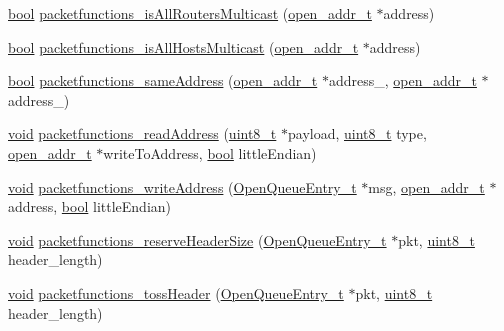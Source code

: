 \begin{DoxyCompactItemize}
\item 
\hyperlink{_p_e___types_8h_a97a80ca1602ebf2303258971a2c938e2}{bool} \hyperlink{group___packet_functions_ga47c60182596145c31db05b11926cdcb2}{packetfunctions\+\_\+is\+All\+Routers\+Multicast} (\hyperlink{structopen__addr__t}{open\+\_\+addr\+\_\+t} $\ast$address)
\item 
\hyperlink{_p_e___types_8h_a97a80ca1602ebf2303258971a2c938e2}{bool} \hyperlink{group___packet_functions_ga4002d21fb26813d4652268eccf7e4acd}{packetfunctions\+\_\+is\+All\+Hosts\+Multicast} (\hyperlink{structopen__addr__t}{open\+\_\+addr\+\_\+t} $\ast$address)
\item 
\hyperlink{_p_e___types_8h_a97a80ca1602ebf2303258971a2c938e2}{bool} \hyperlink{group___packet_functions_ga1f1461cad2a1e59c303d24fa8e165569}{packetfunctions\+\_\+same\+Address} (\hyperlink{structopen__addr__t}{open\+\_\+addr\+\_\+t} $\ast$address\+\_, \hyperlink{structopen__addr__t}{open\+\_\+addr\+\_\+t} $\ast$address\+\_)
\item 
\hyperlink{usb__devapi_8h_afabf60e7f57651d6d595a02c75f07cd0}{void} \hyperlink{group___packet_functions_ga8d69558563daaaa7d6829353b919cf91}{packetfunctions\+\_\+read\+Address} (\hyperlink{_p_e___types_8h_aba7bc1797add20fe3efdf37ced1182c5}{uint8\+\_\+t} $\ast$payload, \hyperlink{_p_e___types_8h_aba7bc1797add20fe3efdf37ced1182c5}{uint8\+\_\+t} type, \hyperlink{structopen__addr__t}{open\+\_\+addr\+\_\+t} $\ast$write\+To\+Address, \hyperlink{_p_e___types_8h_a97a80ca1602ebf2303258971a2c938e2}{bool} little\+Endian)
\item 
\hyperlink{usb__devapi_8h_afabf60e7f57651d6d595a02c75f07cd0}{void} \hyperlink{group___packet_functions_ga000bbaa2e29486905064fc77ef9f9653}{packetfunctions\+\_\+write\+Address} (\hyperlink{struct_open_queue_entry__t}{Open\+Queue\+Entry\+\_\+t} $\ast$msg, \hyperlink{structopen__addr__t}{open\+\_\+addr\+\_\+t} $\ast$address, \hyperlink{_p_e___types_8h_a97a80ca1602ebf2303258971a2c938e2}{bool} little\+Endian)
\item 
\hyperlink{usb__devapi_8h_afabf60e7f57651d6d595a02c75f07cd0}{void} \hyperlink{group___packet_functions_ga690ad87588077409f382584732259925}{packetfunctions\+\_\+reserve\+Header\+Size} (\hyperlink{struct_open_queue_entry__t}{Open\+Queue\+Entry\+\_\+t} $\ast$pkt, \hyperlink{_p_e___types_8h_aba7bc1797add20fe3efdf37ced1182c5}{uint8\+\_\+t} header\+\_\+length)
\item 
\hyperlink{usb__devapi_8h_afabf60e7f57651d6d595a02c75f07cd0}{void} \hyperlink{group___packet_functions_ga28450dafe3516a0b2275e564ef01fafb}{packetfunctions\+\_\+toss\+Header} (\hyperlink{struct_open_queue_entry__t}{Open\+Queue\+Entry\+\_\+t} $\ast$pkt, \hyperlink{_p_e___types_8h_aba7bc1797add20fe3efdf37ced1182c5}{uint8\+\_\+t} header\+\_\+length)

\end{DoxyCompactItemize}
